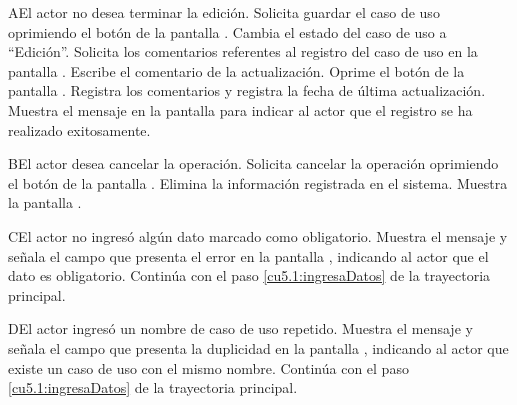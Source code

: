  \begin{UCtrayectoriaA}{A}{El actor no desea terminar la edición.}
    \UCpaso[\UCactor] Solicita guardar el caso de uso oprimiendo el botón  de la pantalla .
    \UCpaso[\UCsist] Cambia el estado del caso de uso a ``Edición''.
    \UCpaso[\UCsist] Solicita los comentarios referentes al registro del caso de uso en la pantalla .
    \UCpaso[\UCactor] Escribe el comentario de la actualización.
    \UCpaso[\UCactor] Oprime el botón  de la pantalla . 
    \UCpaso[\UCsist] Registra los comentarios y registra la fecha de última actualización.
    \UCpaso[\UCsist] Muestra el mensaje  en la pantalla  
    para indicar al actor que el registro se ha realizado exitosamente.
 \end{UCtrayectoriaA}
 \begin{UCtrayectoriaA}{B}{El actor desea cancelar la operación.}
    \UCpaso[\UCactor] Solicita cancelar la operación oprimiendo el botón  de la pantalla .
    \UCpaso[\UCactor] Elimina la información registrada en el sistema.
    \UCpaso[\UCsist] Muestra la pantalla .
 \end{UCtrayectoriaA}
 \begin{UCtrayectoriaA}{C}{El actor no ingresó algún dato marcado como obligatorio.}
    \UCpaso[\UCsist] Muestra el mensaje  y señala el campo que presenta el error en la pantalla 
	    , indicando al actor que el dato es obligatorio.
    \UCpaso[] Continúa con el paso \ref{cu5.1:ingresaDatos} de la trayectoria principal.
 \end{UCtrayectoriaA}
 \begin{UCtrayectoriaA}{D}{El actor ingresó un nombre de caso de uso repetido.}
    \UCpaso[\UCsist] Muestra el mensaje  y señala el campo que presenta la duplicidad en la pantalla 
	    , indicando al actor que existe un caso de uso con el mismo nombre.
    \UCpaso[] Continúa con el paso \ref{cu5.1:ingresaDatos} de la trayectoria principal.
 \end{UCtrayectoriaA}
